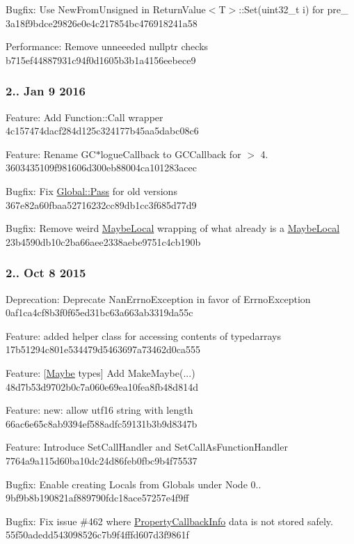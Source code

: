 \begin{DoxyItemize}
\item Bugfix\+: Use New\+From\+Unsigned in Return\+Value$<$\+T$>$\+::\+Set(uint32\+\_\+t i) for pre\+\_ 3a18f9bdce29826e0e4c217854bc476918241a58
\item Performance\+: Remove unneeeded nullptr checks b715ef44887931c94f0d1605b3b1a4156eebece9
\end{DoxyItemize}

\subsubsection*{2.. Jan 9 2016}


\begin{DoxyItemize}
\item Feature\+: Add Function\+::\+Call wrapper 4c157474dacf284d125c324177b45aa5dabc08c6
\item Feature\+: Rename G\+C$\ast$logue\+Callback to G\+C\+Callback for $>$ 4. 3603435109f981606d300eb88004ca101283acec
\item Bugfix\+: Fix \hyperlink{class_global_a60ed905942749405e9d916d3de627f72}{Global\+::\+Pass} for old versions 367e82a60fbaa52716232cc89db1cc3f685d77d9
\item Bugfix\+: Remove weird \hyperlink{class_maybe_local}{Maybe\+Local} wrapping of what already is a \hyperlink{class_maybe_local}{Maybe\+Local} 23b4590db10c2ba66aee2338aebe9751c4cb190b
\end{DoxyItemize}

\subsubsection*{2.. Oct 8 2015}


\begin{DoxyItemize}
\item Deprecation\+: Deprecate Nan\+Errno\+Exception in favor of Errno\+Exception 0af1ca4cf8b3f0f65ed31bc63a663ab3319da55c
\item Feature\+: added helper class for accessing contents of typedarrays 17b51294c801e534479d5463697a73462d0ca555
\item Feature\+: \mbox{[}\hyperlink{class_maybe}{Maybe} types\mbox{]} Add Make\+Maybe(...) 48d7b53d9702b0c7a060e69ea10fea8fb48d814d
\item Feature\+: new\+: allow utf16 string with length 66ac6e65c8ab9394ef588adfc59131b3b9d8347b
\item Feature\+: Introduce Set\+Call\+Handler and Set\+Call\+As\+Function\+Handler 7764a9a115d60ba10dc24d86feb0fbc9b4f75537
\item Bugfix\+: Enable creating Locals from Globals under Node 0.. 9bf9b8b190821af889790fdc18ace57257e4f9ff
\item Bugfix\+: Fix issue \#462 where \hyperlink{class_property_callback_info}{Property\+Callback\+Info} data is not stored safely. 55f50adedd543098526c7b9f4fffd607d3f9861f
\end{DoxyItemize}

